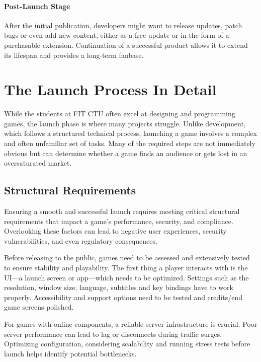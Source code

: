 \paragraph{Post-Launch Stage}
After the initial publication, developers might want to release updates, patch bugs or even add new content, either as a free update or in the form of a purchasable extension. Continuation of a successful product allows it to extend its lifespan and provides a long-term fanbase.
\cite{bramble_7-stages, rocket_6-stages}

\section{The Launch Process In Detail}\label{sec:launch-in-detail}
While the students at FIT CTU often excel at designing and programming games, the launch phase is where many projects struggle. Unlike development, which follows a structured technical process, launching a game involves a complex and often unfamiliar set of tasks. Many of the required steps are not immediately obvious but can determine whether a game finds an audience or gets lost in an oversaturated market.

\subsection{Structural Requirements}
Ensuring a smooth and successful launch requires meeting critical structural requirements that impact a game’s performance, security, and compliance. Overlooking these factors can lead to negative user experiences, security vulnerabilities, and even regulatory consequences.

Before releasing to the public, games need to be assessed and extensively tested to ensure stability and playability. The first thing a player interacts with is the UI---a launch screen or app---which needs to be optimized. Settings such as the resolution, window size, language, subtitles and key bindings have to work properly. Accessibility and support options need to be tested and credits/end game screens polished.
\cite{silva_guide-to-release}

For games with online components, a reliable server infrastructure is crucial. Poor server performance can lead to lag or disconnects during traffic surges. Optimizing configuration, considering scalability and running stress tests before launch helps identify potential bottlenecks.
\cite{sentika_how-to-optimize}

